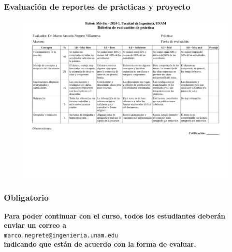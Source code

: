 \begin{frame}\frametitle{Evaluación de reportes de prácticas y proyecto}
  \begin{figure}
    \centering
    \includegraphics[height=1.25\textheight]{Figures/Rubrica.pdf}
  \end{figure}
\end{frame}

\begin{frame}\frametitle{Obligatorio}
  \textbf{Para poder continuar con el curso, todos los estudiantes deberán enviar un correo a }
  \[\]
  \texttt{marco.negrete@ingenieria.unam.edu}
  \[\]
  \textbf{indicando que están de acuerdo con la forma de evaluar.}
\end{frame}

